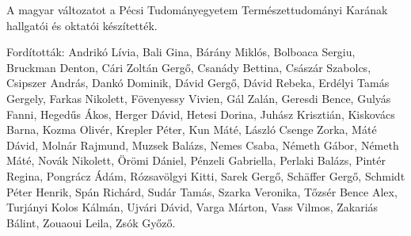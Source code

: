 {
A magyar változatot a Pécsi Tudományegyetem Természettudományi Karának hallgatói és oktatói készítették.

Fordították: Andrikó Lívia, Bali Gina, Bárány Miklós, Bolboaca Sergiu, Bruckman Denton,
Cári Zoltán Gergő, Csanády Bettina, Császár Szabolcs, Csipszer András, Dankó Dominik, Dávid Gergő, Dávid Rebeka, Erdélyi Tamás Gergely,
Farkas Nikolett, Fövenyessy Vivien, Gál Zalán, Geresdi Bence, Gulyás Fanni,
Hegedűs Ákos, Herger Dávid, Hetesi Dorina,
Juhász Krisztián, Kiskovács Barna, Kozma Olivér, Krepler Péter, Kun Máté,
László Csenge Zorka, Máté Dávid, Molnár Rajmund, Muzsek Balázs,
Nemes Csaba, Németh Gábor, Németh Máté, Novák Nikolett,
Örömi Dániel,
Pénzeli Gabriella, Perlaki Balázs, Pintér Regina, Pongrácz Ádám,
Rózsavölgyi Kitti,
Sarek Gergő, Schäffer Gergő, Schmidt Péter Henrik, Spán Richárd, Sudár Tamás, Szarka Veronika,
Tőzsér Bence Alex, Turjányi Kolos Kálmán, Ujvári Dávid,
Varga Márton, Vass Vilmos, Zakariás Bálint, Zouaoui Leila, Zsók Győző.
}